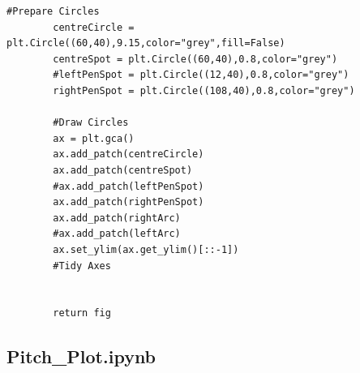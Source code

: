 \begin{lstlisting}[style=Python]
        #Prepare Circles
        centreCircle = plt.Circle((60,40),9.15,color="grey",fill=False)
        centreSpot = plt.Circle((60,40),0.8,color="grey")
        #leftPenSpot = plt.Circle((12,40),0.8,color="grey")
        rightPenSpot = plt.Circle((108,40),0.8,color="grey")

        #Draw Circles
        ax = plt.gca()
        ax.add_patch(centreCircle)
        ax.add_patch(centreSpot)
        #ax.add_patch(leftPenSpot)
        ax.add_patch(rightPenSpot)      
        ax.add_patch(rightArc)
        #ax.add_patch(leftArc)
        ax.set_ylim(ax.get_ylim()[::-1])
        #Tidy Axes

    
        return fig
\end{lstlisting}

\subsection{Pitch\_Plot.ipynb}
